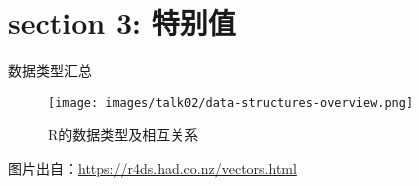 \documentclass[ignorenonframetext,]{beamer}
\begin{document}
\hypertarget{section-3-ux7279ux522bux503c}{%
\section{section 3: 特别值}\label{section-3-ux7279ux522bux503c}}

\begin{frame}{数据类型汇总}
\protect\hypertarget{ux6570ux636eux7c7bux578bux6c47ux603b}{}
\begin{figure}
\centering
\texttt{[image: images/talk02/data-structures-overview.png]}
\caption{R的数据类型及相互关系}
\end{figure}

图片出自：\url{https://r4ds.had.co.nz/vectors.html}
\end{frame}
\end{document}
